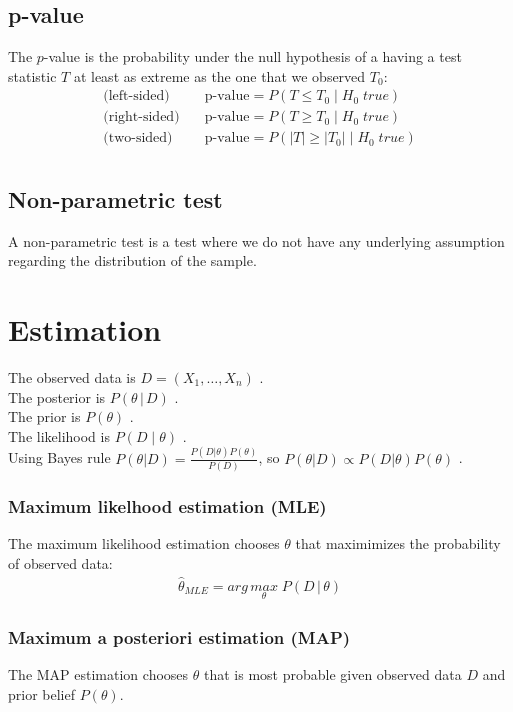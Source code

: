 \documentclass{report}
\begin{document}
\subsection{p-value}
The $p$-value is the probability under the null hypothesis of a having a test statistic $T$ at
least as extreme as the one that we observed $T_0$:
\begin{align*}
    \text{(left-sided)} \quad & \text{p-value} = P(T \leq T_0\; |\; H_0\; true) \\
    \text{(right-sided)}\quad & \text{p-value} = P(T \geq T_0\; |\; H_0\; true) \\
    \text{(two-sided)}  \quad & \text{p-value} = P(|T| \geq |T_0|\; |\; H_0\; true) \\
\end{align*}

\subsection{Non-parametric test}
A non-parametric test is a test where we do not have any underlying assumption regarding the
distribution of the sample.

\section{Estimation}
The observed data is $D = (X_1, \dots, X_n)$ . \\
The posterior is $P(\theta\, | \, D)$ . \\
The prior is $P(\theta)$ . \\
The likelihood is $P(D\; |\; \theta)$ . \\
Using Bayes rule $P(\theta | D) = \frac{P(D|\theta)P(\theta)}{P(D)}$,
so $P(\theta | D) \propto P(D|\theta)P(\theta)$ .

\subsubsection{Maximum likelhood estimation (MLE)}
 The maximum likelihood estimation chooses $\theta$ that maximimizes the probability of observed data:
\begin{align*}
    \hat{\theta}_{MLE} = arg\,\underset{\theta}{max}\; P(D\,|\, \theta)
\end{align*}

\subsubsection{Maximum a posteriori estimation (MAP)}
The MAP estimation chooses $\theta$ that is most probable given observed data $D$ and prior belief
$P(\theta)$. \\
\end{document}
